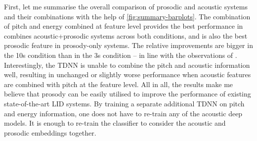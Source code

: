 \documentclass[bsc,frontabs,twoside,singlespacing,parskip,deptreport]{infthesis}
\begin{document}
{{    %
    First, let me summarise the overall comparison of prosodic and acoustic systems and their combinations with the help of \autoref{fig:summary-barplots}.
    The combination of pitch and energy combined at feature level provides the best performance in combines acoustic+prosodic systems across both conditions, and is also the best prosodic feature in prosody-only systems.
    The relative improvements are bigger in the 10s condition than in the 3s condition -- in line with the observations of \citet{Martinez_et_al_2012}.
    Interestingly, the TDNN is unable to combine the pitch and acoustic information well, resulting in unchanged or slightly worse performance when acoustic features are combined with pitch at the feature level.
    All in all, the results make me believe that prosody can be easily utilised to improve the performance of existing state-of-the-art LID systems. By training a separate additional TDNN on pitch and energy information, one does not have to re-train any of the acoustic deep models. It is enough to re-train the classifier to consider the acoustic and prosodic embeddings together.
  }

}
\end{document}
